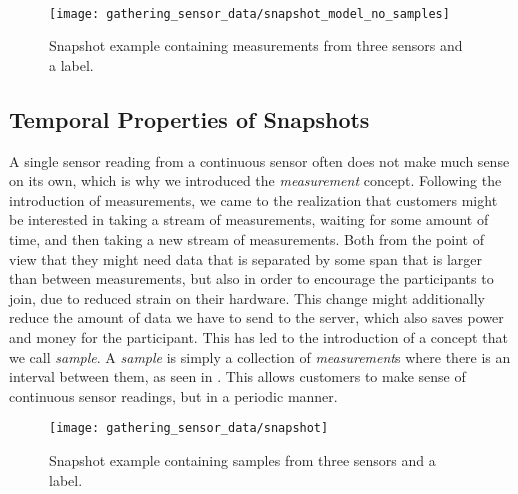 \\
\begin{figure}[!htbp]
    \centering
    \texttt{[image: gathering\_sensor\_data/snapshot\_model\_no\_samples]}
    \caption{Snapshot example containing measurements from three sensors and a label.}
    \label{fig:snapshot_model_no_samples}
\end{figure}
\FloatBarrier



\subsection{Temporal Properties of Snapshots}
\label{sec:temporal_properties_of_snapshots}


A single sensor reading from a continuous sensor often does not make much sense on its own, which is why we introduced the \emph{measurement} concept. Following the introduction of measurements, we came to the realization that customers might be interested in taking a stream of measurements, waiting for some amount of time, and then taking a new stream of measurements. Both from the point of view that they might need data that is separated by some span that is larger than between measurements, but also in order to encourage the participants to join, due to reduced strain on their hardware. This change might additionally reduce the amount of data we have to send to the server, which also saves power and money for the participant. This has led to the introduction of a concept that we call \emph{sample}. A \emph{sample} is simply a collection of \emph{measurement}s where there is an interval between them, as seen in . This allows customers to make sense of continuous sensor readings, but in a periodic manner. 

\begin{figure}[!htbp]
    \centering
    \texttt{[image: gathering\_sensor\_data/snapshot]}
    \caption{Snapshot example containing samples from three sensors and a label.}
    \label{fig:snapshot_example_with_samples}
\end{figure}
\FloatBarrier

